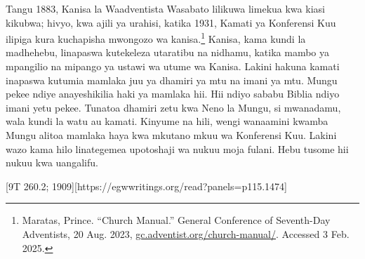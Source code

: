 Tangu 1883, Kanisa la Waadventista Wasabato lilikuwa limekua kwa kiasi kikubwa; hivyo, kwa ajili ya urahisi, katika 1931, Kamati ya Konferensi Kuu ilipiga kura kuchapisha mwongozo wa kanisa.\footnote{Maratas, Prince. “Church Manual.” General Conference of Seventh-Day Adventists, 20 Aug. 2023, \href{https://gc.adventist.org/church-manual/}{gc.adventist.org/church-manual/}. Accessed 3 Feb. 2025.} Kanisa, kama kundi la madhehebu, linapaswa kutekeleza utaratibu na nidhamu, katika mambo ya mpangilio na mipango ya ustawi wa utume wa Kanisa. Lakini hakuna kamati inapaswa kutumia mamlaka juu ya dhamiri ya mtu na imani ya mtu. Mungu pekee ndiye anayeshikilia haki ya mamlaka hii. Hii ndiyo sababu Biblia ndiyo imani yetu pekee. Tunatoa dhamiri zetu kwa Neno la Mungu, si mwanadamu, wala kundi la watu au kamati. Kinyume na hili, wengi wanaamini kwamba Mungu alitoa mamlaka haya kwa mkutano mkuu wa Konferensi Kuu. Lakini wazo kama hilo linategemea upotoshaji wa nukuu moja fulani. Hebu tusome hii nukuu kwa uangalifu.


[9T 260.2; 1909][https://egwwritings.org/read?panels=p115.1474]


